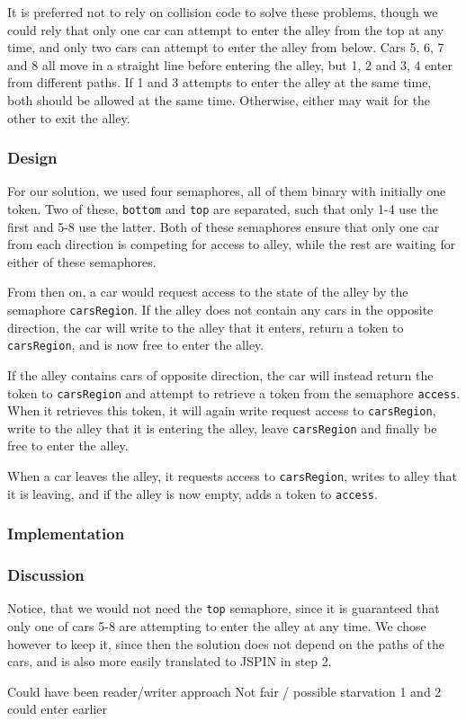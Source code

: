 It is preferred not to rely on collision code to solve these problems, though we could rely that only one car can attempt to enter the alley from the top at any time, and only two cars can attempt to enter the alley from below. Cars 5, 6, 7 and 8 all move in a straight line before entering the alley, but 1, 2 and 3, 4 enter from different paths. If 1 and 3 attempts to enter the alley at the same time, both should be allowed at the same time. Otherwise, either may wait for the other to exit the alley.

\subsubsection*{Design}
For our solution, we used four semaphores, all of them binary with initially one token. Two of these, \texttt{bottom} and \texttt{top} are separated, such that only 1-4 use the first and 5-8 use the latter. Both of these semaphores ensure that only one car from each direction is competing for access to alley, while the rest are waiting for either of these semaphores.

From then on, a car would request access to the state of the alley by the semaphore \texttt{carsRegion}. If the alley does not contain any cars in the opposite direction, the car will write to the alley that it enters, return a token to \texttt{carsRegion}, and is now free to enter the alley.

If the alley contains cars of opposite direction, the car will instead return the token to \texttt{carsRegion} and attempt to retrieve a token from the semaphore \texttt{access}. When it retrieves this token, it will again write request access to \texttt{carsRegion}, write to the alley that it is entering the alley, leave \texttt{carsRegion} and finally be free to enter the alley.

When a car leaves the alley, it requests access to \texttt{carsRegion}, writes to alley that it is leaving, and if the alley is now empty, adds a token to \texttt{access}.

\subsubsection*{Implementation}

\subsubsection*{Discussion}

Notice, that we would not need the \texttt{top} semaphore, since it is guaranteed that only one of cars 5-8 are attempting to enter the alley at any time. We chose however to keep it, since then the solution does not depend on the paths of the cars, and is also more easily translated to JSPIN in step 2.

Could have been reader/writer approach
Not fair / possible starvation
1 and 2 could enter earlier